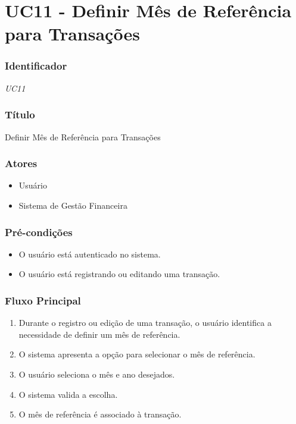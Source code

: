 \chapter{UC11 -  Definir Mês de Referência para Transações}
\label{apendiceUC11}

\subsection*{Identificador}
\textit{UC11}

\subsection*{Título}
Definir Mês de Referência para Transações

\subsection*{Atores}
\begin{addmargin}[1.5cm]{0cm}
	\begin{itemize}
		\item Usuário
		\item Sistema de Gestão Financeira
	\end{itemize}
\end{addmargin}

\subsection*{Pré-condições}
\begin{addmargin}[1.5cm]{0cm}
	\begin{itemize}
		\item O usuário está autenticado no sistema.
		\item O usuário está registrando ou editando uma transação.
	\end{itemize}
\end{addmargin}

\subsection*{Fluxo Principal}
\begin{addmargin}[1.5cm]{0cm}
	\begin{enumerate}
		\item Durante o registro ou edição de uma transação, o usuário identifica a necessidade de definir um mês de referência.
		\item O sistema apresenta a opção para selecionar o mês de referência.
		\item O usuário seleciona o mês e ano desejados.
		\item O sistema valida a escolha.
		\item O mês de referência é associado à transação.
	\end{enumerate}
\end{addmargin}

